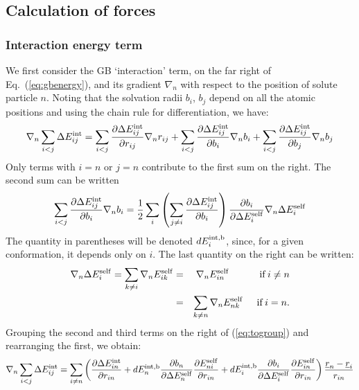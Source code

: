 \documentclass[12pt]{report}
\newcommand{\und}{\underline}
\begin{document}
\subsection{Calculation of forces}
\subsubsection{Interaction energy term}
We first consider the GB `interaction' term, on the far right of
Eq.\ (\ref{eq:gbenergy}), and its gradient $\nabla_n$ with respect
to the position of solute particle $n$. Noting that the solvation
radii $b_i$, $b_j$ depend on all the atomic positions and using the
chain rule for differentiation, we have:
\begin{equation} \label{eq:togroup}
\nabla_n \sum_{i<j} \Delta E^{\rm int}_{ij} =
  \sum_{i<j} \frac{\partial \Delta E^{\rm int}_{ij}}{\partial r_{ij}} \nabla_n r_{ij} +
  \sum_{i<j} \frac{\partial \Delta E^{\rm int}_{ij}}{\partial b_i} \nabla_n b_i +
  \sum_{i<j} \frac{\partial \Delta E^{\rm int}_{ij}}{\partial b_j} \nabla_n b_j
\end{equation}
Only terms with $i =n$ or $j=n$ contribute to the first sum on the right.
The second sum can be written
\begin{equation} 
\sum_{i<j} \frac{\partial \Delta E^{\rm int}_{ij}}{\partial b_i} \nabla_n b_i =
\frac{1}{2} \sum_i \left( 
   \sum_{j \neq i} \frac{\partial \Delta E^{\rm int}_{ij}}{\partial b_i} 
                   \right) 
   \frac{\partial b_i}{\partial \Delta E^{\rm self}_i} \nabla_n \Delta E^{\rm self}_i
\end{equation}
The quantity in parentheses will be denoted $dE^{\rm int,b}_i$,
since, for a given conformation, it depends only on $i$. The last quantity
on the right can be written:
\begin{eqnarray}
\nabla_n \Delta E^{\rm self}_i = \sum_{k \neq i} \nabla_n E^{\rm self}_{ik}
&=&  \nabla_n E^{\rm self}_{in} \hspace*{11mm} {\rm if } \, i \neq n \nonumber \\
&=& \sum_{k \neq n} \nabla_n E^{\rm self}_{nk} \hspace*{5mm} {\rm if } \, i = n.
\end{eqnarray}
Grouping the second and third terms on the right of (\ref{eq:togroup}) and
rearranging the first, we obtain:
\begin{equation} \label{eq:force}
\nabla_n \sum_{i<j} \Delta E^{\rm int}_{ij} =
 \sum_{i \neq n} \left( \frac{\partial \Delta E^{\rm int}_{in}}{\partial r_{in}} +
  dE^{\rm int,b}_n \frac{\partial b_n}{\partial \Delta E^{\rm self}_n} 
    \frac{\partial E^{\rm self}_{ni}}{\partial r_{in}} +
   dE^{\rm int,b}_i \frac{\partial b_i}{\partial \Delta E^{\rm self}_i}
       \frac{\partial E^{\rm self}_{in}}{\partial r_{in}} \right) \frac{\und{r}_n - \und{r}_i}{r_{in}}
\end{equation}
\end{document}
